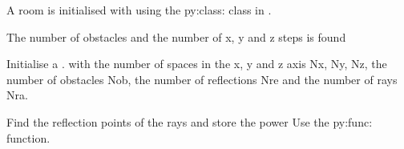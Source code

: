 \documentclass[letterpaper,10pt,english]{sphinxmanual}
\begin{document}
\begin{fulllineitems}
\begin{itemize}
\end{itemize}

A room is initialised with  using the py:class:   class in {\hyperref[\detokenize{index:module-Room}]{}}.

The number of obstacles and the number of x, y and z steps is found

\begin{sphinxVerbatim}[commandchars=\\\{\}]
\end{sphinxVerbatim}

Initialise a .   {\hyperref[\detokenize{index:DictionarySparseMatrix.DS}]{}} with the   number of spaces in the x, y and z axis Nx, Ny, Nz, the number of   obstacles Nob, the number of reflections Nre and the number of rays Nra.

\begin{sphinxVerbatim}[commandchars=\\\{\}]
\end{sphinxVerbatim}

Find the reflection points of the rays and store the power Use the   py:func: function.

\begin{sphinxVerbatim}[commandchars=\\\{\}]
 
\end{sphinxVerbatim}


\end{fulllineitems}
\end{document}
